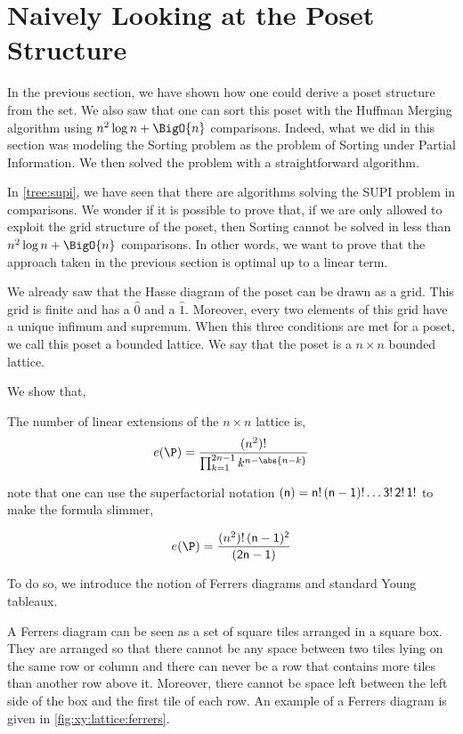 \section{Naively Looking at the Poset Structure}
\label{tree:xy:grid}

In the previous section, we have shown how one could derive a poset structure
from the \XY set. We also saw that one can sort this \XY poset with the Huffman
Merging algorithm using \(n^2 \log n + \BigO{n}\) comparisons. Indeed, what we
did in this section was modeling the Sorting \XY problem as the problem of
Sorting under Partial Information. We then solved the problem with a
straightforward algorithm.

In \ref{tree:supi}, we have seen that there are algorithms solving the SUPI
problem in  comparisons. We wonder if it is possible to prove
that, if we are only allowed to exploit the grid structure of the \XY poset,
then Sorting \XY cannot be solved in less than \(n^2 \log n + \BigO{n}\)
comparisons. In other words, we want to prove that the approach taken in the
previous section is optimal up to a linear term.

We already saw that the Hasse diagram of the poset \XY can be drawn as a grid.
This grid is finite and has a \(\hat{0}\) and a \(\hat{1}\). Moreover, every
two elements of this grid have a unique infimum and supremum. When this three
conditions are met for a poset, we call this poset a bounded lattice. We say
that the poset \XY is a \( n \times n \) bounded lattice.

We show that,

\begin{theorem}
The number of linear extensions of the \( n \times n \) lattice is,
\begin{displaymath}
e(\P) = \frac{(n^2)!}{\prod_{k=1}^{2n-1} k^{n - \abs{n-k}}}
\end{displaymath}
\end{theorem}

note that one can use the superfactorial notation
\( \sf(n) = n!\,(n-1)!\ldots 3!\,2!\,1! \)
to make the formula slimmer,

\begin{displaymath}
e(\P) = \frac{(n^2)! \, \sf(n-1)^2}{\sf(2n-1)}
\end{displaymath}

To do so, we introduce the notion of Ferrers diagrams and standard Young tableaux.

A Ferrers diagram can be seen as a set of square tiles arranged in a square
box. They are arranged so that there cannot be any space between two tiles
lying on the same row or column and there can never be a row that contains more
tiles than another row above it. Moreover, there cannot be space left between
the left side of the box and the first tile of each row. An example of a
Ferrers diagram is given in \ref{fig:xy:lattice:ferrers}.


